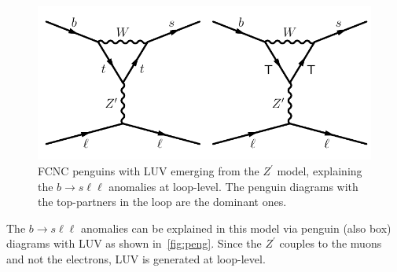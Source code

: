 \begin{figure}[htpb!]
	\centering
	\includegraphics[scale=.75]{figures/zp_penguin.pdf}
	\caption{FCNC penguins with LUV emerging from the $Z^\prime$ model, explaining the $b \to s \ell \ell$ anomalies at loop-level. The penguin diagrams with the top-partners in the loop are the dominant ones. }
	\label{fig:peng}
\end{figure}
The $ b \to s \ell \ell$ anomalies can be explained in this model via penguin (also box) diagrams with LUV as shown in~\autoref{fig:peng}. Since the $Z^\prime$ couples to the muons and not the electrons, LUV is generated at loop-level. 
